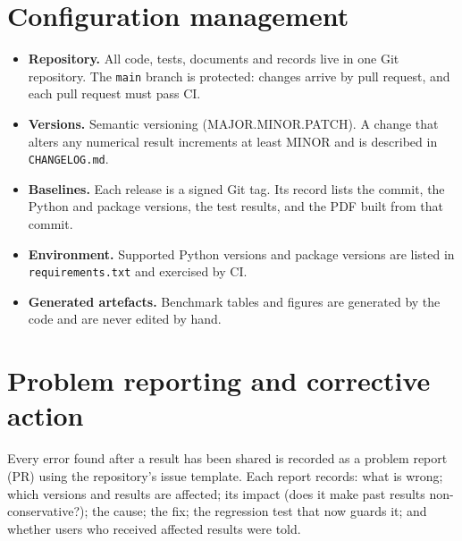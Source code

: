 \documentclass[11pt]{article}
\begin{document}
\section{Configuration management}\label{sec:cm}
\begin{itemize}
  \item \textbf{Repository.} All code, tests, documents and records live in one Git
        repository. The \texttt{main} branch is protected: changes arrive by pull
        request, and each pull request must pass CI.
  \item \textbf{Versions.} Semantic versioning (MAJOR.MINOR.PATCH). A change that alters any
        numerical result increments at least MINOR and is described in
        \texttt{CHANGELOG.md}.
  \item \textbf{Baselines.} Each release is a signed Git tag. Its record lists the commit,
        the Python and package versions, the test results, and the PDF built from that
        commit.
  \item \textbf{Environment.} Supported Python versions and package versions are listed in
        \texttt{requirements.txt} and exercised by CI.
  \item \textbf{Generated artefacts.} Benchmark tables and figures are generated by the
        code and are never edited by hand.
\end{itemize}

\section{Problem reporting and corrective action}\label{sec:prca}
Every error found after a result has been shared is recorded as a problem report (PR)
using the repository's issue template. Each report records: what is wrong; which versions
and results are affected; its impact (does it make past results non-conservative?); the
cause; the fix; the regression test that now guards it; and whether users who received
affected results were told.
\end{document}

